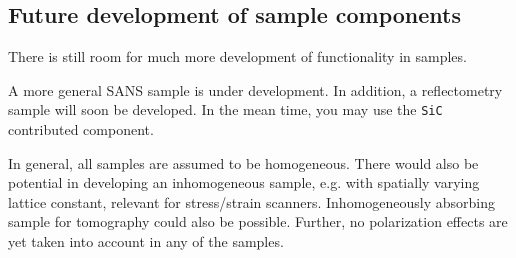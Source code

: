 \subsection{Future development of sample components}
There is still room for much more development of functionality in
\MCS samples.

A more general SANS sample is under development.
In addition, a reflectometry sample will soon be developed. In the mean time, you may use the \verb+SiC+ contributed component.

In general, all samples are assumed to be homogeneous. There would also be
potential in developing an inhomogeneous sample, e.g. with
spatially varying lattice constant, relevant for stress/strain scanners.
Inhomogeneously absorbing sample for tomography could also be possible.
Further, no polarization effects are yet taken into account in any
of the samples.


         \newpage
        \newpage
          \newpage
   \newpage
             \newpage
           \newpage


